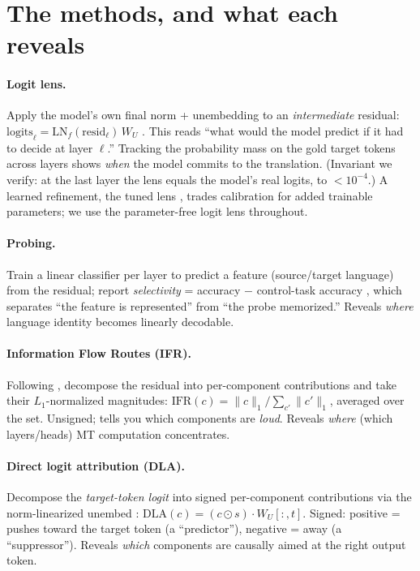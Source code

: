 \documentclass[11pt]{article}
\begin{document}
\section{The methods, and what each reveals}

\paragraph{Logit lens.} Apply the model's own final norm + unembedding to an
\emph{intermediate} residual: $\text{logits}_\ell = \text{LN}_f(\text{resid}_\ell)\,W_U$
\citep{nostalgebraist2020logit}.
This reads ``what would the model predict if it had to decide at layer
$\ell$.'' Tracking the probability mass on the gold target tokens across
layers shows \emph{when} the model commits to the translation. (Invariant we
verify: at the last layer the lens equals the model's real logits, to
$<\!10^{-4}$.) A learned refinement, the tuned lens \citep{belrose2023tunedlens},
trades calibration for added trainable parameters; we use the parameter-free
logit lens throughout.

\paragraph{Probing.} Train a linear classifier per layer \citep{alain2017probes}
to predict a feature
(source/target language) from the residual; report \emph{selectivity} =
accuracy $-$ control-task accuracy \citep{hewitt2019control}, which separates
``the feature is represented'' from ``the probe memorized.'' Reveals
\emph{where} language identity becomes linearly decodable.

\paragraph{Information Flow Routes (IFR).} Following \citet{ferrando2024ifr},
decompose the residual into
per-component contributions and take their $L_1$-normalized magnitudes:
$\text{IFR}(c)=\lVert c\rVert_1 / \sum_{c'}\lVert c'\rVert_1$, averaged over
the set. Unsigned; tells you which components are \emph{loud}. Reveals
\emph{where} (which layers/heads) MT computation concentrates.

\paragraph{Direct logit attribution (DLA).} Decompose the \emph{target-token
logit} into signed per-component contributions via the norm-linearized
unembed \citep{elhage2021framework}: $\text{DLA}(c)=(c\odot s)\cdot W_U[:,t]$. Signed: positive = pushes
toward the target token (a ``predictor''), negative = away (a
``suppressor''). Reveals \emph{which} components are causally aimed at the
right output token.
\end{document}
